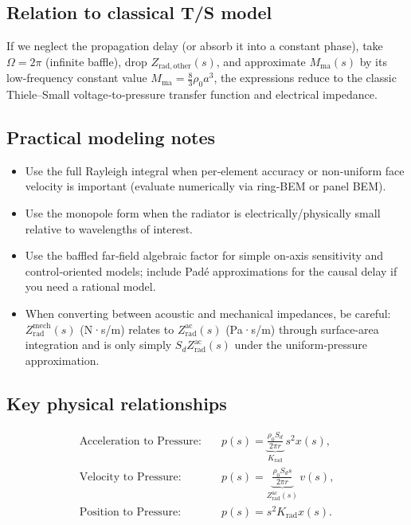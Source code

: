 \subsection{Relation to classical T/S model}
If we neglect the propagation delay (or absorb it into a constant phase), take \(\Omega = 2\pi\) (infinite baffle), drop \(Z_{\mathrm{rad,other}}(s)\), and approximate \(M_{\mathrm{ma}}(s)\) by its low‑frequency constant value \(M_{\mathrm{ma}} = \frac{8}{3}\rho_0 a^3\), the expressions reduce to the classic Thiele–Small voltage‑to‑pressure transfer function and electrical impedance.

\subsection{Practical modeling notes}
\begin{itemize}
  \item Use the full Rayleigh integral when per‑element accuracy or non‑uniform face velocity is important (evaluate numerically via ring‑BEM or panel BEM).  
  \item Use the monopole form when the radiator is electrically/physically small relative to wavelengths of interest.  
  \item Use the baffled far‑field algebraic factor for simple on‑axis sensitivity and control‑oriented models; include Padé approximations for the causal delay if you need a rational model.  
  \item When converting between acoustic and mechanical impedances, be careful: \(Z_{\mathrm{rad}}^{\mathrm{mech}}(s)\) (N·s/m) relates to \(Z_{\mathrm{rad}}^{\mathrm{ac}}(s)\) (Pa·s/m) through surface‑area integration and is only simply \(S_d Z_{\mathrm{rad}}^{\mathrm{ac}}(s)\) under the uniform‑pressure approximation.
\end{itemize}

\subsection*{Key physical relationships}
\begin{align*}
\text{Acceleration to Pressure:} &\quad p(s)=\underbrace{\frac{\rho_0 S_d}{2\pi r}}_{K_{\text{rad}}}\,s^2 x(s), \\
\text{Velocity to Pressure:} &\quad p(s)=\underbrace{\frac{\rho_0 S_d s}{2\pi r}}_{Z_{\mathrm{rad}}^{\mathrm{ac}}(s)}\,v(s), \\
\text{Position to Pressure:} &\quad p(s)=s^2 K_{\text{rad}} x(s).
\end{align*}

